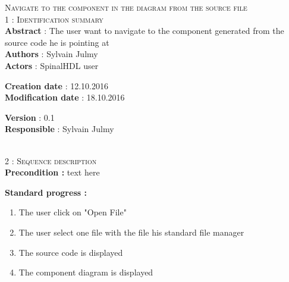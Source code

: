 \begin{flushleft}
    \textsc{\huge Navigate to the component in the diagram from the source file}\\[0.5cm]

    \BlackLine
    \textsc{\Large 1 : Identification summary}\\[0.3cm]

        \textbf{\large Abstract} : The user want to navigate to the component generated from the source code he is pointing at \\[0.1cm]

        \textbf{\large Authors} : Sylvain Julmy \\[0.3cm]			

        \textbf{\large Actors} : SpinalHDL user \\[0.1cm]	
    \begin{minipage}{0.40\textwidth}
        \begin{flushleft}	
            \textbf{\large Creation date} : 12.10.2016 \\[0.1cm]

            \textbf{\large Modification date} : 18.10.2016 \\[0.1cm]
        \end{flushleft}
    \end{minipage}
    \begin{minipage}{0.40\textwidth}
        \begin{flushleft}
            \textbf{\large Version} : 0.1 \\[0.1cm]

            \textbf{\large Responsible} : Sylvain Julmy \\[0.1cm]
        \end{flushleft}
    \end{minipage}
    \\[0.5cm]
    \BlackLine
    \textsc{\Large 2 : Sequence description}\\[0.3cm]

    \textbf{\large Precondition :} text here

    \textbf{\large  Standard progress :}
    \begin{enumerate}[nosep]
        \item The user click on "Open File"
        \item The user select one file with the file his standard file manager
        \item The source code is displayed
        \item The component diagram is displayed
    \end{enumerate}


\end{flushleft}
